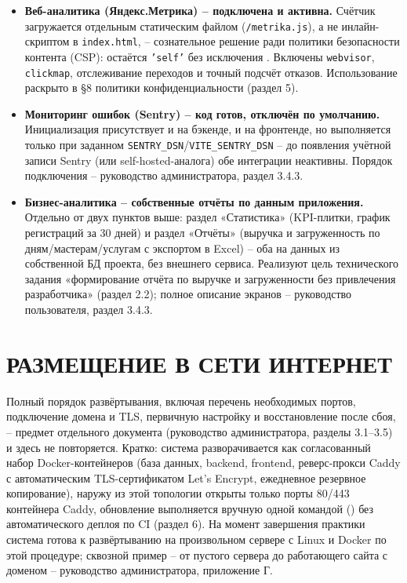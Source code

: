 \begin{itemize}
  \item \textbf{Веб-аналитика (Яндекс.Метрика) -- подключена и активна.}
        Счётчик загружается отдельным статическим файлом
        (\texttt{/metrika.js}), а не инлайн-скриптом в
        \texttt{index.html}, -- сознательное решение ради политики
        безопасности контента (CSP):  остаётся
        \texttt{'self'} без исключения .
        Включены \texttt{webvisor}, \texttt{clickmap}, отслеживание
        переходов и точный подсчёт отказов. Использование раскрыто в §8
        политики конфиденциальности (раздел 5).
  \item \textbf{Мониторинг ошибок (Sentry) -- код готов, отключён по
        умолчанию.} Инициализация присутствует и на бэкенде, и на
        фронтенде, но выполняется только при заданном
        \texttt{SENTRY\_DSN}/\texttt{VITE\_SENTRY\_DSN} -- до появления
        учётной записи Sentry (или self-hosted-аналога) обе интеграции
        неактивны. Порядок подключения -- руководство администратора,
        раздел 3.4.3.
  \item \textbf{Бизнес-аналитика -- собственные отчёты по данным
        приложения.} Отдельно от двух пунктов выше: раздел «Статистика»
        (KPI-плитки, график регистраций за 30 дней) и раздел «Отчёты»
        (выручка и загруженность по дням/мастерам/услугам с экспортом в
        Excel) -- оба на данных из собственной БД проекта, без внешнего
        сервиса. Реализуют цель технического задания «формирование
        отчёта по выручке и загруженности без привлечения разработчика»
        (раздел 2.2); полное описание экранов -- руководство
        пользователя, раздел 3.4.3.
\end{itemize}

\section{РАЗМЕЩЕНИЕ В СЕТИ ИНТЕРНЕТ}

Полный порядок развёртывания, включая перечень необходимых портов,
подключение домена и TLS, первичную настройку и восстановление после
сбоя, -- предмет отдельного документа (руководство администратора,
разделы 3.1--3.5) и здесь не повторяется. Кратко: система разворачивается
как согласованный набор Docker-контейнеров (база данных, backend,
frontend, реверс-прокси Caddy с автоматическим TLS-сертификатом
Let's Encrypt, ежедневное резервное копирование), наружу из этой
топологии открыты только порты 80/443 контейнера Caddy, обновление
выполняется вручную одной командой () без
автоматического деплоя по CI (раздел 6). На момент завершения практики
система готова к развёртыванию на произвольном сервере с Linux и Docker
по этой процедуре; сквозной пример -- от пустого сервера до работающего
сайта с доменом -- руководство администратора, приложение Г.


